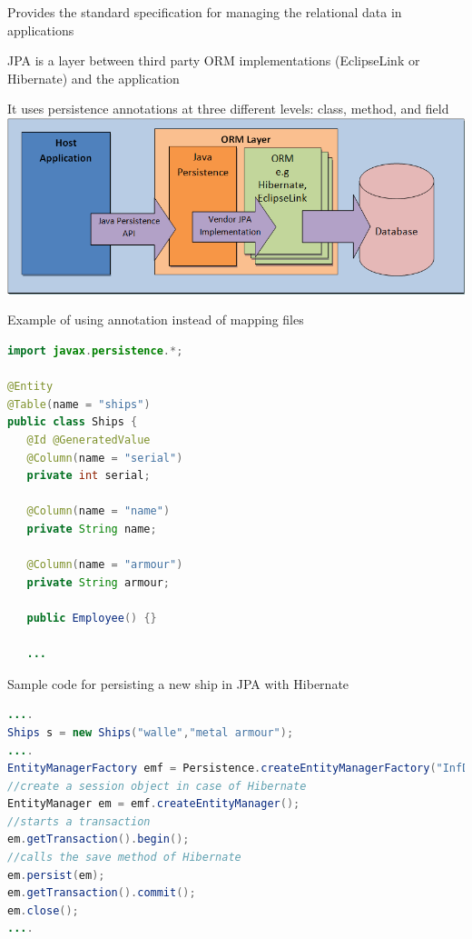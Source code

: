 \documentclass{beamer}
\begin{document}
\begin{slide}{
\item Provides the standard specification for managing the relational data in applications
\item JPA is a layer between third party ORM implementations (EclipseLink or Hibernate) and the application 
\item It uses persistence annotations at three different levels: class, method, and field
\\
\includegraphics[scale=0.3]{img/JPA.png}
}
\end{slide} 


\begin{frame}[fragile]
Example of using annotation instead of mapping files 
\begin{lstlisting}[language=java]
import javax.persistence.*;

@Entity
@Table(name = "ships")
public class Ships {
   @Id @GeneratedValue
   @Column(name = "serial")
   private int serial;

   @Column(name = "name")
   private String name;

   @Column(name = "armour")
   private String armour; 

   public Employee() {}
   
   ...
   \end{lstlisting} 
\end{frame}


\begin{frame}[fragile]
Sample code for persisting a new ship in JPA with Hibernate 
\begin{lstlisting}[language=java]
....	 
Ships s = new Ships("walle","metal armour");
....
EntityManagerFactory emf = Persistence.createEntityManagerFactory("InfDev5PU");
//create a session object in case of Hibernate
EntityManager em = emf.createEntityManager();
//starts a transaction 
em.getTransaction().begin();
//calls the save method of Hibernate
em.persist(em);
em.getTransaction().commit();
em.close();
....
\end{lstlisting} 
\end{frame} 
 
\end{document}
